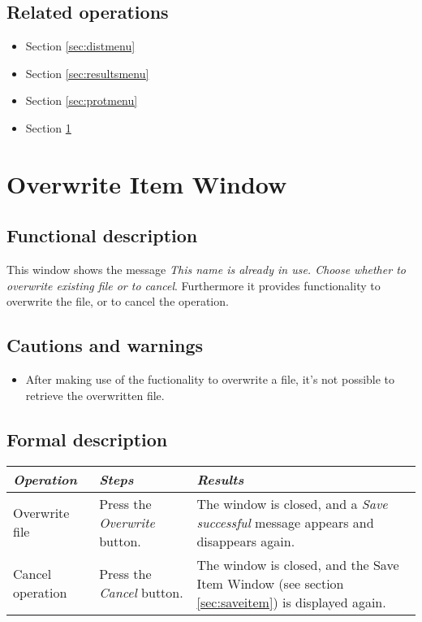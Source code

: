   \subsection*{Related operations}
   \begin{itemize}
   \item Section \ref{sec:distmenu}
   \item Section \ref{sec:resultsmenu}
   \item Section \ref{sec:protmenu}
   \item Section \ref{sec:overwriteitem}
  \end{itemize}

\section{Overwrite Item Window}
\label{sec:overwriteitem}
  \subsection*{Functional description}
  This window shows the message \emph{This name is already in use. Choose whether to overwrite existing file or to cancel}. Furthermore it provides functionality to overwrite the file, or to cancel the operation.

  \subsection*{Cautions and warnings}
  \begin{itemize}
  \item After making use of the fuctionality to overwrite a file, it's not possible to retrieve the overwritten file.
  \end{itemize}

  \subsection*{Formal description}
    \begin{tabularx}{\textwidth}{XXX}
    \toprule
    \emph{Operation} & \emph{Steps} & \emph{Results} \\
    \midrule
    Overwrite file & Press the \emph{Overwrite} button. & The window is closed, and a \emph{Save successful} message appears and disappears again. \\
    \midrule
    Cancel operation & Press the \emph{Cancel} button. & The window is closed, and the Save Item Window (see section \ref{sec:saveitem}) is displayed again. \\
    \bottomrule
\end{tabularx}

